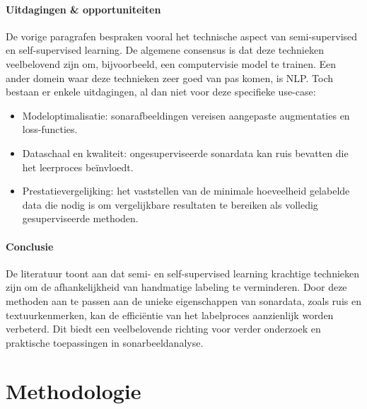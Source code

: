 \paragraph{Uitdagingen \& opportuniteiten}

De vorige paragrafen bespraken vooral het technische aspect van semi-supervised en self-supervised learning. De algemene consensus is dat deze technieken veelbelovend zijn om, bijvoorbeeld, een computervisie model te trainen. Een ander domein waar deze technieken zeer goed van pas komen, is NLP. Toch bestaan er enkele uitdagingen, al dan niet voor deze specifieke use-case:

\begin{itemize}
    \item Modeloptimalisatie: sonarafbeeldingen vereisen aangepaste augmentaties en loss-functies.
    \item Dataschaal en kwaliteit: ongesuperviseerde sonardata kan ruis bevatten die het leerproces beïnvloedt.
    \item Prestatievergelijking: het vaststellen van de minimale hoeveelheid gelabelde data die nodig is om vergelijkbare resultaten te bereiken als volledig gesuperviseerde methoden.
\end{itemize}

\paragraph{Conclusie}

De literatuur toont aan dat semi- en self-supervised learning krachtige technieken zijn om de afhankelijkheid van handmatige labeling te verminderen. Door deze methoden aan te passen aan de unieke eigenschappen van sonardata, zoals ruis en textuurkenmerken, kan de efficiëntie van het labelproces aanzienlijk worden verbeterd. Dit biedt een veelbelovende richting voor verder onderzoek en praktische toepassingen in sonarbeeldanalyse.


\section{Methodologie}%
\label{sec:methodologie}

